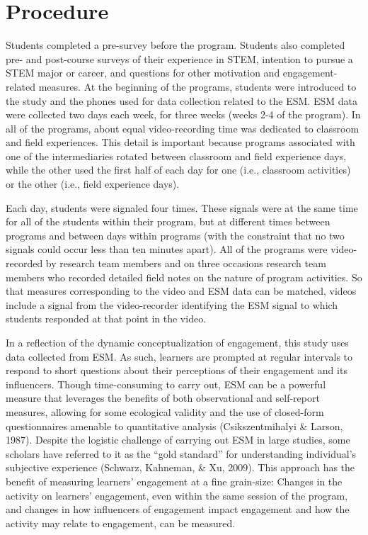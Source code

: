 \documentclass[]{book}
\theoremstyle{definition}
\theoremstyle{definition}
\theoremstyle{definition}
\theoremstyle{remark}
\begin{document}
\section{Procedure}\label{procedure}

Students completed a pre-survey before the program. Students also
completed pre- and post-course surveys of their experience in STEM,
intention to pursue a STEM major or career, and questions for other
motivation and engagement-related measures. At the beginning of the
programs, students were introduced to the study and the phones used for
data collection related to the ESM. ESM data were collected two days
each week, for three weeks (weeks 2-4 of the program). In all of the
programs, about equal video-recording time was dedicated to classroom
and field experiences. This detail is important because programs
associated with one of the intermediaries rotated between classroom and
field experience days, while the other used the first half of each day
for one (i.e., classroom activities) or the other (i.e., field
experience days).

Each day, students were signaled four times. These signals were at the
same time for all of the students within their program, but at different
times between programs and between days within programs (with the
constraint that no two signals could occur less than ten minutes apart).
All of the programs were video-recorded by research team members and on
three occasions research team members who recorded detailed field notes
on the nature of program activities. So that measures corresponding to
the video and ESM data can be matched, videos include a signal from the
video-recorder identifying the ESM signal to which students responded at
that point in the video.

In a reflection of the dynamic conceptualization of engagement, this
study uses data collected from ESM. As such, learners are prompted at
regular intervals to respond to short questions about their perceptions
of their engagement and its influencers. Though time-consuming to carry
out, ESM can be a powerful measure that leverages the benefits of both
observational and self-report measures, allowing for some ecological
validity and the use of closed-form questionnaires amenable to
quantitative analysis (Csikszentmihalyi \& Larson, 1987). Despite the
logistic challenge of carrying out ESM in large studies, some scholars
have referred to it as the ``gold standard'' for understanding
individual's subjective experience (Schwarz, Kahneman, \& Xu, 2009).
This approach has the benefit of measuring learners' engagement at a
fine grain-size: Changes in the activity on learners' engagement, even
within the same session of the program, and changes in how influencers
of engagement impact engagement and how the activity may relate to
engagement, can be measured.
\end{document}
